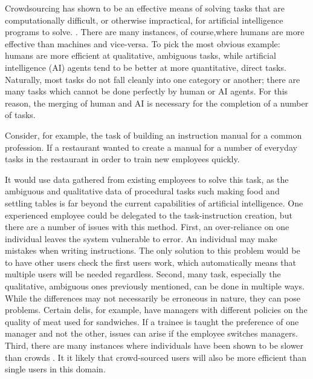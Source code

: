 Crowdsourcing has shown to be an effective means of solving tasks that are computationally difficult, or otherwise impractical, for artificial intelligence programs to solve. \cite{howie2006rise}. 
There are many instances, of course,where humans are more effective than machines and vice-versa. 
To pick the most obvious example: humans are more efficient at qualitative, ambiguous tasks, while artificial intelligence (AI) agents tend to be better at more quantitative, direct tasks.
Naturally, most tasks do not fall cleanly into one category or another; there are many tasks which cannot be done perfectly by human or AI agents. 
For this reason, the merging of human and AI is necessary for the completion of a number of tasks.

Consider, for example, the task of building an instruction manual for a common profession. 
If a restaurant wanted to create a manual for a number of everyday tasks in the restaurant in order to train new employees quickly.

It would use data gathered from existing employees to solve this task, as the ambiguous and qualitative data of procedural tasks such making food and settling tables is far beyond the current capabilities of artificial intelligence.
One experienced employee could be delegated to the task-instruction creation, but there are a number of issues with this method.
First, an over-reliance on one individual leaves the system vulnerable to error.
An individual may make mistakes when writing instructions.
The only solution to this problem would be to have other users check the first users work, which automatically means that multiple users will be needed regardless.
Second, many task, especially the qualitative, ambiguous ones previously mentioned, can be done in multiple ways.
While the differences may not necessarily be erroneous in nature, they can pose problems.
Certain delis, for example, have managers with different policies on the quality of meat used for sandwiches.
If a trainee is taught the preference of one manager and not the other, issues can arise if the employee switches managers.
Third, there are many instances where individuals have been shown to be slower than crowds \cite{lasecki2013interactive,}.
It it likely that crowd-sourced users will also be more efficient than single users in this domain.

